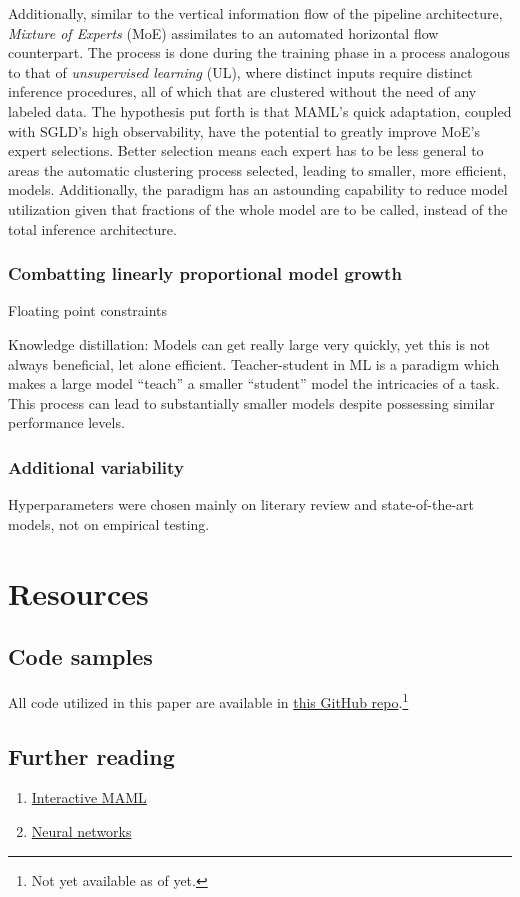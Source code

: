 \documentclass[conference]{IEEEtran}
\begin{document}
Additionally, similar to the vertical information flow of the pipeline architecture, \textit{Mixture of Experts} (MoE) assimilates to an automated horizontal flow counterpart. The process is done during the training phase in a process analogous to that of \textit{unsupervised learning} (UL), where distinct inputs require distinct inference procedures, all of which that are clustered without the need of any labeled data. The hypothesis put forth is that MAML's quick adaptation, coupled with SGLD's high observability, have the potential to greatly improve MoE's expert selections. Better selection means each expert has to be less general to areas the automatic clustering process selected, leading to smaller, more efficient, models. Additionally, the paradigm has an astounding capability to reduce model utilization given that fractions of the whole model are to be called, instead of the total inference architecture.

\subsubsection{Combatting linearly proportional model growth}
Floating point constraints

Knowledge distillation: Models can get really large very quickly, yet this is not always beneficial, let alone efficient. Teacher-student in ML is a paradigm which makes a large model ``teach'' a smaller ``student'' model the intricacies of a task. This process can lead to substantially smaller models despite possessing similar performance levels.

\subsubsection{Additional variability}
Hyperparameters were chosen mainly on literary review and state-of-the-art models, not on empirical testing.

\section{Resources} \label{resources}

\subsection{Code samples}
All code utilized in this paper are available in \href{github.com}{this GitHub repo}.\footnote{Not yet available as of yet.}

\subsection{Further reading}

\begin{enumerate}
    \item \href{https://interactive-maml.github.io/}{Interactive MAML} \cite{interactive_maml}
    \item \href{https://youtube.com/playlist?list=PLZHQObOWTQDNU6R1_67000Dx_ZCJB-3pi}{Neural networks} \cite{3b1b_nn}
\end{enumerate}


\end{document}
